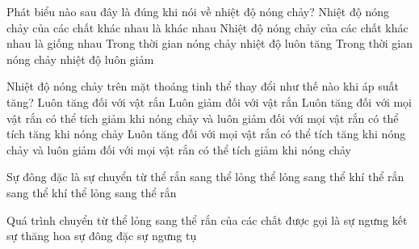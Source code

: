 \begin{ex} 
	Phát biểu nào sau đây là đúng khi nói về nhiệt độ nóng chảy?
	\choice
	{\True Nhiệt độ nóng chảy của các chất khác nhau là khác nhau}
	{Nhiệt độ nóng chảy của các chất khác nhau là giống nhau}
	{Trong thời gian nóng chảy nhiệt độ luôn tăng}
	{Trong thời gian nóng chảy nhiệt độ luôn giảm}
\end{ex}

\begin{ex} 
	Nhiệt độ nóng chảy trên mặt thoáng tinh thể thay đổi như thế nào khi áp suất tăng?
	\choice
	{Luôn tăng đối với vật rắn}
	{Luôn giảm đối với vật rắn}
	{Luôn tăng đối với mọi vật rắn có thể tích giảm khi nóng chảy và luôn giảm đối với mọi vật rắn có thể tích tăng khi nóng chảy}
	{\True Luôn tăng đối với mọi vật rắn có thể tích tăng khi nóng chảy và luôn giảm đối với mọi vật rắn có thể tích giảm khi nóng chảy}
\end{ex}
















\begin{ex}
	Sự đông đặc là sự chuyển từ
	\choice
	{thể rắn sang thể lỏng}
	{thể lỏng sang thể khí}
	{thể rắn sang thể khí}
	{\True thể lỏng sang thể rắn}
	\end{ex}





\begin{ex} 
	Quá trình chuyển từ thể lỏng sang thể rắn của các chất được gọi là
	\choice
	{sự ngưng kết}
	{sự thăng hoa}
	{\True sự đông đặc}
	{sự ngưng tụ}
\end{ex}


